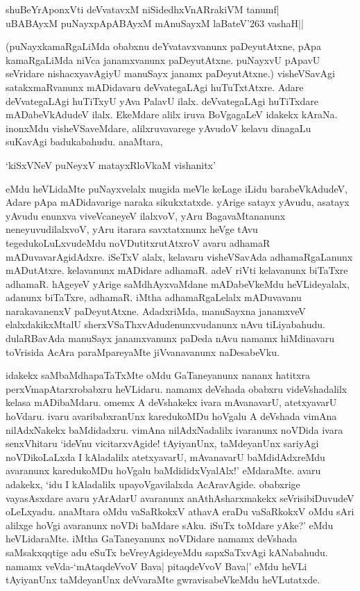 \begin{shloka}
shuBeYrAponxVti deVvatavxM niSidedhxVnARrakiVM tanumf|\\
uBABAyxM puNayxpApABAyxM mAnuSayxM laBateV\char'263 vashaH||
\end{shloka}

(puNayxkamaRgaLiMda obabxnu deYvatavxvanunx paDeyutAtxne, pApa kamaRgaLiMda niVca janamxvanunx paDeyutAtxne. puNayxvU pApavU seVridare nishacxyavAgiyU manuSayx janamx paDeyutAtxne.) visheVSavAgi satakxmaRvanunx mADidavaru deVvategaLAgi huTuTxtAtxre. Adare deVvategaLAgi huTiTxyU yAva PalavU ilalx. deVvategaLAgi huTiTxdare mADabeVkAdudeV ilalx. EkeMdare alilx iruva BoVgagaLeV idakekx kAraNa. inonxMdu visheVSaveMdare, alilxruvavarege yAvudoV kelavu dinagaLu suKavAgi badukabahudu. anaMtara,

\begin{shloka}
`kiSxVNeV puNeyxV matayxRloVkaM vishanitx'
\end{shloka}

eMdu heVLidaMte puNayxvelalx mugida meVle keLage iLidu barabeVkAdudeV, Adare pApa mADidavarige naraka sikukxtatxde. yArige satayx yAvudu, asatayx yAvudu enunxva viveVcaneyeV ilalxvoV, yAru BagavaMtananunx neneyuvudilalxvoV, yAru itarara savxtatxnunx heVge tAvu tegedukoLuLxvudeMdu noVDutitxrutAtxroV avaru adhamaR mADuvavarAgidAdxre. iSeTxV alalx, kelavaru visheVSavAda adhamaRgaLanunx mADutAtxre. kelavanunx mADidare adhamaR. adeV riVti kelavanunx biTaTxre adhamaR. hAgeyeV yArige saMdhAyxvaMdane mADabeVkeMdu heVLideyalalx, adanunx biTaTxre, adhamaR. iMtha adhamaRgaLelalx mADuvavanu narakavanenxV paDeyutAtxne. AdadxriMda, manuSayxna janamxveV elalxdakikxMtalU sherxVSaThxvAdudenunxvudanunx nAvu tiLiyabahudu. dulaRBavAda manuSayx janamxvanunx paDeda nAvu namamx hiMdinavaru toVrisida AcAra paraMpareyaMte jiVvanavanunx naDesabeVku.

idakekx saMbaMdhapaTaTxMte oMdu GaTaneyanunx nananx hatitxra perxVmapAtarxrobabxru heVLidaru. namamx deVshada obabxru videVshadalilx kelasa mADibaMdaru. omemx A deVshakekx ivara mAvanavarU, atetxyavarU hoVdaru. ivaru avaribabxranUnx karedukoMDu hoVgalu A deVshada vimAna nilAdxNakekx  baMdidadxru. vimAna nilAdxNadalilx ivaranunx noVDida ivara senxVhitaru `ideVnu vicitarxvAgide! tAyiyanUnx, taMdeyanUnx sariyAgi noVDikoLaLxda I kAladalilx atetxyavarU, mAvanavarU baMdidAdxreMdu avaranunx karedukoMDu hoVgalu baMdididxVyalAlx!' eMdaraMte. avaru adakekx, `idu I kAladalilx upayoVgavilalxda AcAravAgide. obabxrige vayasAsxdare avaru yArAdarU avaranunx anAthAsharxmakekx seVrisibiDuvudeV oLeLxyadu. anaMtara oMdu vaSaRkokxV athavA eraDu vaSaRkokxV oMdu sAri alilxge hoVgi avaranunx noVDi baMdare sAku. iSuTx toMdare yAke?' eMdu heVLidaraMte. iMtha GaTaneyanunx noVDidare namamx deVshada saMsakxqqtige adu eSuTx beVreyAgideyeMdu sapxSaTxvAgi kANabahudu. namamx veVda-`mAtaqdeVvoV Bava| pitaqdeVvoV Bava|' eMdu heVLi tAyiyanUnx taMdeyanUnx deVvaraMte gwravisabeVkeMdu heVLutatxde.

